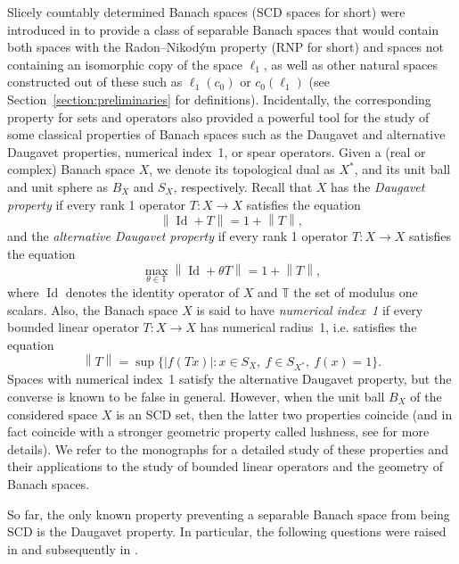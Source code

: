 \documentclass[11pt,a4paper,reqno]{amsart}
\numberwithin{equation}{section}
\newcommand{\abs}[1]{\left\lvert#1\right\rvert}
\newcommand{\norm}[1]{\left\lVert#1\right\rVert}
\DeclareMathOperator{\Id}{Id}
\newcommand{\1}{\mathbbm{1}}
\newcommand{\T}{\mathbb{T}}
\theoremstyle{plain}
\theoremstyle{definition}
\begin{document}
Slicely countably determined Banach spaces (SCD spaces for short) were introduced in \cite{AKMMS10} to provide a class of separable Banach spaces that would contain both spaces with the Radon--Nikod\'ym property (RNP for short) and spaces not containing an isomorphic copy of the space $\ell_1$, as well as other natural spaces constructed out of these such as $\ell_1(c_0)$ or $c_0(\ell_1)$ (see Section~\ref{section:preliminaries} for definitions). Incidentally, the corresponding property for sets and operators also provided a powerful tool for the study of some classical properties of Banach spaces such as the Daugavet and alternative Daugavet properties, numerical index~1, or spear operators. Given a (real or complex) Banach space $X$, we denote its topological dual as $X^*$, and its unit ball and unit sphere as $B_X$ and $S_X$, respectively. Recall that $X$ has the \emph{Daugavet property} if every rank 1 operator $T:X\to X$ satisfies the equation \begin{equation*}
    \norm{\Id+T}=1+\norm{T},
\end{equation*}
and the \emph{alternative Daugavet property} if every rank 1 operator $T:X\to X$ satisfies the equation
\begin{equation*}
    \max_{\theta\in \T}\norm{\Id+\theta T}=1+\norm{T},
\end{equation*} 
where $\Id$ denotes the identity operator of $X$ and $\mathbb{T}$ the set of modulus one scalars. Also, the Banach space $X$ is said to have \emph{numerical index~1} if every bounded linear operator $T:X\to X$ has numerical radius~1, i.e. satisfies the equation \begin{equation*}
    \norm{T}=\sup\{\abs{f(Tx)}\colon x\in S_X,\ f\in S_{X^*},\ f(x)=1\}.
\end{equation*}
Spaces with numerical index~1 satisfy the alternative Daugavet property, but the converse is known to be false in general. However, when the unit ball $B_X$ of the considered space $X$ is an SCD set, then the latter two properties coincide (and in fact coincide with a stronger geometric property called lushness, see \cite{AKMMS10} for more details). We refer to the monographs \cite{KMMP,KMRZW25} for a detailed study of these properties and their applications to the study of bounded linear operators and the geometry of Banach spaces. 

So far, the only known property preventing a separable Banach space from being SCD is the Daugavet property. In particular, the following questions were raised in \cite{AKMMS10} and subsequently in \cite{KPW18}.
\end{document}
